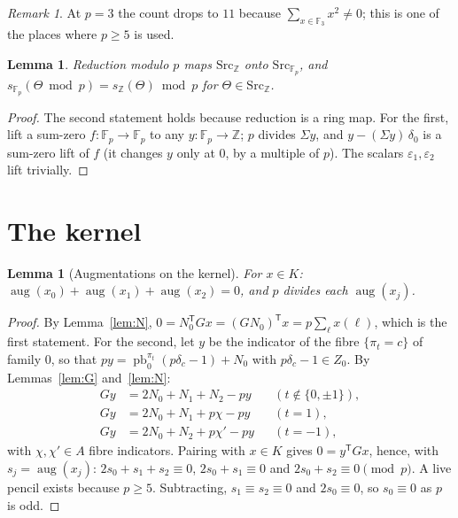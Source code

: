 \documentclass[11pt]{article}
\newtheorem{lemma}[theorem]{Lemma}
\theoremstyle{definition}
\theoremstyle{remark}
\newtheorem{remark}[theorem]{Remark}
\newcommand{\Z}{\mathbb{Z}}
\newcommand{\F}{\mathbb{F}}
\newcommand{\pb}{\operatorname{pb}}
\newcommand{\aug}{\operatorname{aug}}
\begin{document}
\begin{remark}
At $p=3$ the count drops to $11$ because $\sum_{x\in\F_3}x^2\neq0$; this is one of the places where $p\ge5$ is used.
\end{remark}

\begin{lemma}\label{lem:lift}
Reduction modulo $p$ maps $\mathrm{Src}_\Z$ onto $\mathrm{Src}_{\F_p}$, and $s_{\F_p}(\Theta\bmod p)=s_\Z(\Theta)\bmod p$ for $\Theta\in\mathrm{Src}_\Z$.
\end{lemma}

\begin{proof}
The second statement holds because reduction is a ring map. For the first, lift a sum-zero $f:\F_p\to\F_p$ to any $y:\F_p\to\Z$; $p$ divides $\Sigma y$, and $y-(\Sigma y)\,\delta_0$ is a sum-zero lift of $f$ (it changes $y$ only at $0$, by a multiple of $p$). The scalars $\varepsilon_1,\varepsilon_2$ lift trivially.
\end{proof}

\section{The kernel}\label{sec:K}

\begin{lemma}[Augmentations on the kernel]\label{lem:R2}
For $x\in K$: $\aug(x_0)+\aug(x_1)+\aug(x_2)=0$, and $p$ divides each $\aug(x_j)$.
\end{lemma}

\begin{proof}
By Lemma~\ref{lem:N}, $0=N_0^{\mathsf T}Gx=(GN_0)^{\mathsf T}x=p\sum_{\ell}x(\ell)$, which is the first statement. For the second, let $y$ be the indicator of the fibre $\{\pi_t=c\}$ of family $0$, so that $py=\pb_0^{\pi_t}(p\delta_c-1)+N_0$ with $p\delta_c-1\in Z_0$. By Lemmas~\ref{lem:G} and~\ref{lem:N}:
\begin{align*}
Gy&=2N_0+N_1+N_2-py && (t\notin\{0,\pm1\}),\\
Gy&=2N_0+N_1+p\chi-py && (t=1),\\
Gy&=2N_0+N_2+p\chi'-py && (t=-1),
\end{align*}
with $\chi,\chi'\in A$ fibre indicators. Pairing with $x\in K$ gives $0=y^{\mathsf T}Gx$, hence, with $s_j=\aug(x_j)$: $2s_0+s_1+s_2\equiv0$, $2s_0+s_1\equiv0$ and $2s_0+s_2\equiv0\pmod p$. A live pencil exists because $p\ge5$. Subtracting, $s_1\equiv s_2\equiv0$ and $2s_0\equiv0$, so $s_0\equiv0$ as $p$ is odd.
\end{proof}
\end{document}
